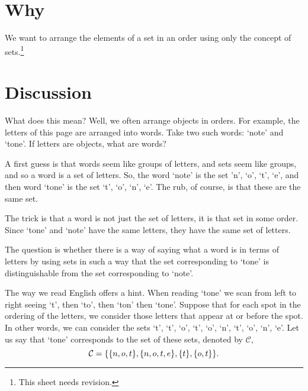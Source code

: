 

\section*{Why}

We want to arrange the elements of a set in an order using only the concept of sets.\footnote{This sheet needs revision.}

\section*{Discussion}

What does this mean? Well, we often arrange objects in orders.
For example, the letters of this page are arranged into words.
Take two such words: `note' and `tone'.
If letters are objects, what are words?

A first guess is that words seem like groups of letters, and sets seem like groups, and so a word is a set of letters.
So, the word `note' is the set {'n', `o', `t', `e'}, and then word `tone' is the set {`t', `o', `n', `e'}.
The rub, of course, is that these are the same set.

The trick is that a word is not just the set of letters, it is that set in some order.
Since `tone' and `note' have the same letters, they have the same set of letters.

The question is whether there is a way of saying what a word is in terms of letters by using sets in such a way that the set corresponding to `tone' is distinguishable from the set corresponding to `note'.


The way we read English offers a hint.
When reading `tone' we scan from left to right seeing `t', then `to', then `ton' then `tone'.
Suppose that for each spot in the ordering of the letters, we consider those letters that appear at or before the spot.
In other words, we can consider the sets {`t'}, {`t', `o'}, {`t', `o', `n'}, {`t', `o', `n', `e'}.
Let us say that `tone' corresponds to the set of these sets, denoted by $\mathcal{C} $,
\[
\mathcal{C}  = \{\{n, o, t\}, \{n, o, t, e\}, \{t\}, \{o, t\}\}.
\]

